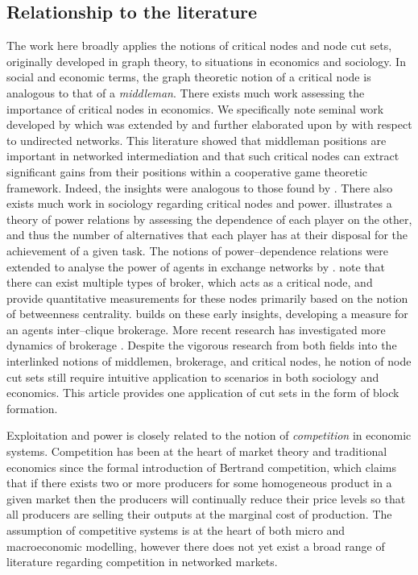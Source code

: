 \subsection{Relationship to the literature}

The work here broadly applies the notions of critical nodes and node cut sets, originally developed in graph theory, to situations in economics and sociology. In social and economic terms, the graph theoretic notion of a critical node is analogous to that of a \emph{middleman}. There exists much work assessing the importance of critical nodes in economics. We specifically note seminal work developed by \citet{KalaiMiddlemen1978} which was extended by \citet{JacksonWolinsky1996} and further elaborated upon by \citet{GillesChakrabarti2006} with respect to undirected networks. This literature showed that middleman positions are important in networked intermediation and that such critical nodes can extract significant gains from their positions within a cooperative game theoretic framework. Indeed, the insights were analogous to those found by \citet{RubinsteinWolinsky1987}. There also exists much work in sociology regarding critical nodes and power. \citet{Emerson1962} illustrates a theory of power relations by assessing the dependence of each player on the other, and thus the number of alternatives that each player has at their disposal for the achievement of a given task. The notions of power--dependence relations were extended to analyse the power of agents in exchange networks by \citet{CookEmersonGillmoreYamagishi1983}. \citet{GouldFernandez1989} note that there can exist multiple types of broker, which acts as a critical node, and provide quantitative measurements for these nodes primarily based on the notion of betweenness centrality. \citet{Gould1989} builds on these early insights, developing a measure for an agents inter--clique brokerage. More recent research has investigated more dynamics of brokerage \citep{Spiro2013}. Despite the vigorous research from both fields into the interlinked notions of middlemen, brokerage, and critical nodes, he notion of node cut sets still require intuitive application to scenarios in both sociology and economics. This article provides one application of cut sets in the form of block formation.

Exploitation and power is closely related to the notion of \emph{competition} in economic systems. Competition has been at the heart of market theory and traditional economics since the formal introduction of Bertrand competition, which claims that if there exists two or more producers for some homogeneous product in a given market then the producers will continually reduce their price levels so that all producers are selling their outputs at the marginal cost of production. The assumption of competitive systems is at the heart of both micro and macroeconomic modelling, however there does not yet exist a broad range of literature regarding competition in networked markets.

